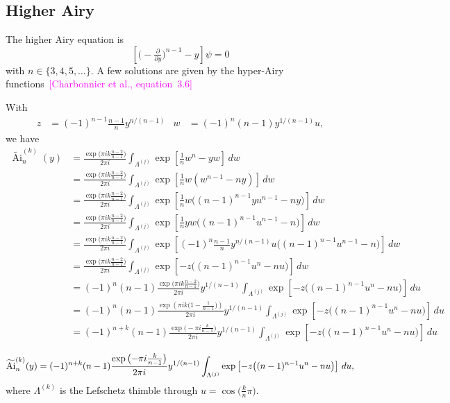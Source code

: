 \documentclass{article}
\DeclareMathOperator{\Ai}{Ai}
\begin{document}
\subsection{Higher Airy}

The higher Airy equation is
\begin{equation}\label{eqn:airy-lucas}
\left[\big({-}\tfrac{\partial}{\partial y}\big)^{n-1} - y\right] \psi = 0
\end{equation}
with $n \in \{3, 4, 5, \ldots\}$. A few solutions are given by the hyper-Airy functions~\textcolor{magenta}{[Charbonnier et al., equation~3.6]}

\color{Peru}
With
\begin{align*}
z & = (-1)^{n-1} \tfrac{n-1}{n} y^{n/(n-1)} & w & = (-1)^n (n-1) y^{1/(n-1)} u,
\end{align*}
we have
\begin{align*}
\widetilde{\Ai}^{(k)}_n(y) & = \frac{\exp\big(\pi ik \tfrac{n-2}{n-1}\big)}{2\pi i} \int_{\Lambda^{(j)}} \exp\left[\tfrac{1}{n}w^n - yw\right]\,dw \\
& = \frac{\exp\big(\pi ik \tfrac{n-2}{n-1}\big)}{2\pi i} \int_{\Lambda^{(j)}} \exp\left[\tfrac{1}{n}w \left(w^{n-1} - ny\right)\right]\,dw \\
& = \frac{\exp\big(\pi ik \tfrac{n-2}{n-1}\big)}{2\pi i} \int_{\Lambda^{(j)}} \exp\left[\tfrac{1}{n}w \big((n-1)^{n-1} yu^{n-1} - ny\big)\right]\,dw \\
& = \frac{\exp\big(\pi ik \tfrac{n-2}{n-1}\big)}{2\pi i} \int_{\Lambda^{(j)}} \exp\left[\tfrac{1}{n}yw \big((n-1)^{n-1} u^{n-1} - n\big)\right]\,dw \\
& = \frac{\exp\big(\pi ik \tfrac{n-2}{n-1}\big)}{2\pi i} \int_{\Lambda^{(j)}} \exp\left[(-1)^n \tfrac{n-1}{n} y^{n/(n-1)} u\big((n-1)^{n-1} u^{n-1} - n\big)\right]\,dw \\
& = \frac{\exp\big(\pi ik \tfrac{n-2}{n-1}\big)}{2\pi i} \int_{\Lambda^{(j)}} \exp\left[-z\big((n-1)^{n-1} u^n - nu\big)\right]\,dw \\
& = (-1)^n (n-1) \frac{\exp\big(\pi ik \tfrac{n-2}{n-1}\big)}{2\pi i} y^{1/(n-1)}\int_{\Lambda^{(j)}} \exp\left[-z\big((n-1)^{n-1} u^n - nu\big)\right]\,du \\
& = (-1)^n (n-1) \frac{\exp\left(\pi ik \big(1 - \tfrac{1}{n-1}\big)\right)}{2\pi i} y^{1/(n-1)}\int_{\Lambda^{(j)}} \exp\left[-z\big((n-1)^{n-1} u^n - nu\big)\right]\,du \\
& = (-1)^{n+k} (n-1) \frac{\exp\big({-}\pi i \tfrac{k}{n-1}\big)}{2\pi i} y^{1/(n-1)}\int_{\Lambda^{(j)}} \exp\left[-z\big((n-1)^{n-1} u^n - nu\big)\right]\,du \\
\end{align*}
\color{black}
\[ \widetilde{\Ai}^{(k)}_n(y) = (-1)^{n+k} (n-1) \frac{\exp\big({-}\pi i \tfrac{k}{n-1}\big)}{2\pi i} y^{1/(n-1)}\int_{\Lambda^{(j)}} \exp\left[-z\big((n-1)^{n-1} u^n - nu\big)\right]\,du \\, \]
where $\Lambda^{(k)}$ is the Lefschetz thimble through $u = \cos\big(\tfrac{k}{n}\pi\big)$.
\end{document}
